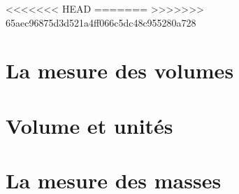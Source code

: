 \documentclass[12pt,a4paper]{article}
\date{}
\title{}
\begin{document}
	
	
<<<<<<< HEAD
=======
>>>>>>> 65aec96875d3d521a4ff066c5dc48c955280a728

\section{La mesure des volumes}









\section{Volume et unités}





%	
%	


\section{La mesure des masses}





\end{document}
